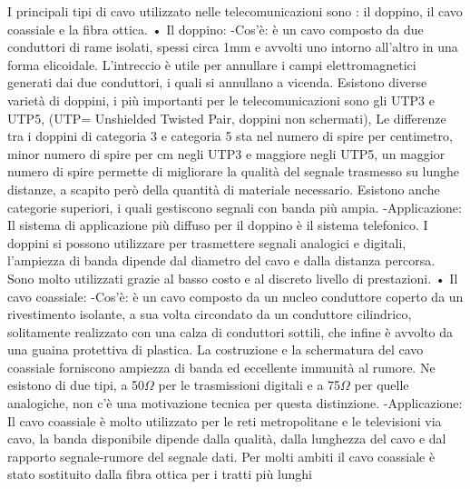 I principali tipi di cavo utilizzato nelle telecomunicazioni sono : il doppino, il cavo coassiale e la fibra ottica.
•	Il doppino:
-Cos’è: è un cavo composto da due conduttori di rame isolati, spessi circa 1mm e avvolti uno intorno all’altro in una forma elicoidale. L’intreccio è utile per annullare i campi elettromagnetici generati dai due conduttori, i quali si annullano a vicenda. Esistono diverse varietà di doppini, i più importanti per le telecomunicazioni sono gli UTP3 e UTP5, (UTP= Unshielded Twisted Pair, doppini non schermati), Le differenze tra i doppini di categoria 3 e categoria 5 sta nel numero di spire per centimetro, minor numero di spire per cm negli UTP3 e maggiore negli UTP5, un maggior numero di spire permette di migliorare la qualità del segnale trasmesso su lunghe distanze, a scapito però della quantità di materiale necessario. Esistono anche categorie superiori, i quali gestiscono segnali con banda più ampia.  
-Applicazione: Il sistema di applicazione più diffuso per il doppino è il sistema telefonico. I doppini si 	possono utilizzare per trasmettere segnali analogici e digitali, l’ampiezza di banda dipende dal diametro del cavo e dalla distanza percorsa. Sono molto utilizzati grazie al basso costo e al discreto livello di prestazioni.
•	Il cavo coassiale:
-Cos’è: è un cavo composto da un nucleo conduttore coperto da un rivestimento isolante, a sua volta circondato da un conduttore cilindrico, solitamente realizzato con una calza di conduttori sottili, che infine è avvolto da una guaina protettiva di plastica. La costruzione e la schermatura del cavo coassiale forniscono ampiezza di banda ed eccellente immunità al rumore. Ne esistono di due tipi, a 50$\Omega$ per le trasmissioni digitali e a 75$\Omega$ per quelle analogiche, non c’è una motivazione tecnica per questa distinzione.
-Applicazione: Il cavo coassiale è molto utilizzato per le reti metropolitane e le televisioni via cavo, la banda disponibile dipende dalla qualità, dalla lunghezza del cavo e dal rapporto segnale-rumore del segnale dati. Per molti ambiti il cavo coassiale è stato sostituito dalla fibra ottica per i tratti più lunghi
 
